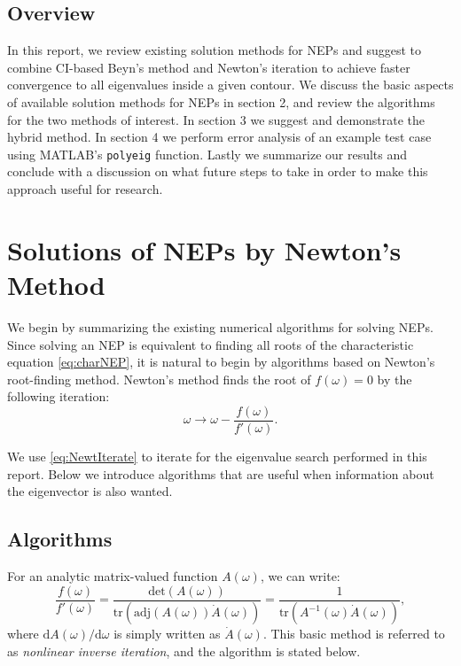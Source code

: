 \documentclass[final,leqno,onefignum,onetabnum]{siamltex1213}
\newcommand{\diff}{\mathrm{d}}
\begin{document}
\subsection{Overview}
In this report, we review existing solution methods for NEPs and suggest to combine CI-based Beyn's method and Newton's iteration to achieve faster convergence to all eigenvalues inside a given contour. We discuss the basic aspects of available solution methods for NEPs in section 2, and review the algorithms for the two methods of interest. In section 3 we suggest and demonstrate the hybrid method. In section 4 we perform error analysis of an example test case using MATLAB's {\tt polyeig} function. Lastly we summarize our results and conclude with a discussion on what future steps to take in order to make this approach useful for research. 

\section{Solutions of NEPs by Newton's Method }
We begin by summarizing the existing numerical algorithms for solving NEPs. Since solving an NEP is equivalent to finding all roots of the characteristic equation \ref{eq:charNEP}, it is natural to begin by algorithms based on Newton's root-finding method. 
Newton's method finds the root of $f(\omega)=0$ by the following iteration:
\begin{equation}
	\label{eq:NewtIterate}
	\omega \rightarrow \omega - \frac{f(\omega)}{f'(\omega)}.
\end{equation}

We use \ref{eq:NewtIterate} to iterate for the eigenvalue search performed in this report. Below we introduce algorithms that are useful when information about the eigenvector is also wanted.
\subsection{Algorithms}
For an analytic matrix-valued function $A(\omega)$, we can write:
\begin{equation*}
\frac{f(\omega)}{f'(\omega)} = \frac{\mathrm{det}(A(\omega))}{ \mathrm{tr} \left( \mathrm{adj}(A(\omega))\dot{A}(\omega)\right)} = \frac{1}{ \mathrm{tr}\left( A^{-1}(\omega)\dot{A}(\omega)\right)},
\end{equation*}
where $\diff A(\omega)/\diff \omega$ is simply written as $\dot{A}(\omega)$. This basic method is referred to as {\it nonlinear inverse iteration}, \citep{anselone_solution_1968} and the algorithm is stated below. 
\end{document}
